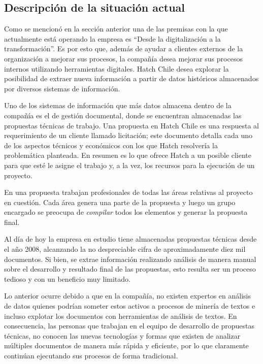 \subsection{Descripción de la situación actual}
Como se mencionó en la sección anterior una de las premisas con la que actualmente está operando la empresa es “Desde la digitalización a la transformación”. Es por esto que, además de ayudar a clientes externos de la organización a mejorar sus procesos, la compañía desea mejorar sus procesos internos utilizando herramientas digitales. Hatch Chile desea explorar la posibilidad de extraer nueva información a partir de datos históricos almacenados por diversos sistemas de información.

 Uno de los sistemas de información que más datos almacena dentro de la compañía es el de gestión documental, donde se encuentran almacenadas las propuestas técnicas de trabajo. Una propuesta en Hatch Chile es una respuesta al requerimiento de un cliente llamado licitación; este documento detalla cada uno de los aspectos técnicos y económicos con los que Hatch resolvería la problemática planteada. En resumen es lo que ofrece Hatch a un posible cliente para que esté le asigne el trabajo y, a la vez, los recursos para la ejecución de un proyecto. 
 
 En una propuesta trabajan profesionales de todas las áreas relativas al proyecto en cuestión. Cada área genera una parte de la propuesta y luego un grupo encargado se preocupa de \emph{compilar} todos los elementos y generar la propuesta final.

Al día de hoy la empresa en estudio tiene almacenadas propuestas técnicas desde el año 2008, alcanzando la no despreciable cifra de aproximadamente diez mil documentos. Si bien, se extrae información realizando análisis de manera manual sobre el desarrollo y resultado final de las propuestas, esto resulta ser un proceso tedioso y con un beneficio muy limitado.

Lo anterior ocurre debido a que en la compañía, no existen expertos en análisis de datos quienes podrían someter estos activos a procesos de minería de textos e incluso explotar los documentos con herramientas de análisis de textos. En consecuencia, las personas que trabajan en el equipo de desarrollo de propuestas técnicas, no conocen las nuevas tecnologías y formas que existen de analizar múltiples documentos de manera más rápida y eficiente, por lo que claramente continúan ejecutando sus procesos de forma tradicional.


